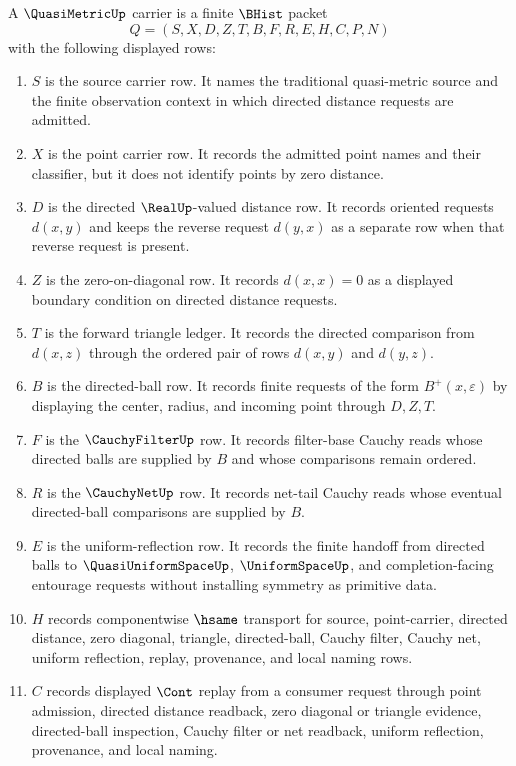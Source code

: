\begin{definition}
\label{def:quasi-metric-carrier}
A $\QuasiMetricUp$ carrier is a finite $\BHist$ packet
$$
Q=(S,X,D,Z,T,B,F,R,E,H,C,P,N)
$$
with the following displayed rows:
\begin{enumerate}
\item $S$ is the source carrier row. It names the traditional quasi-metric source and the finite observation context in which directed distance requests are admitted.
\item $X$ is the point carrier row. It records the admitted point names and their classifier, but it does not identify points by zero distance.
\item $D$ is the directed $\RealUp$-valued distance row. It records oriented requests $d(x,y)$ and keeps the reverse request $d(y,x)$ as a separate row when that reverse request is present.
\item $Z$ is the zero-on-diagonal row. It records $d(x,x)=0$ as a displayed boundary condition on directed distance requests.
\item $T$ is the forward triangle ledger. It records the directed comparison from $d(x,z)$ through the ordered pair of rows $d(x,y)$ and $d(y,z)$.
\item $B$ is the directed-ball row. It records finite requests of the form $B^+(x,\varepsilon)$ by displaying the center, radius, and incoming point through $D,Z,T$.
\item $F$ is the $\CauchyFilterUp$ row. It records filter-base Cauchy reads whose directed balls are supplied by $B$ and whose comparisons remain ordered.
\item $R$ is the $\CauchyNetUp$ row. It records net-tail Cauchy reads whose eventual directed-ball comparisons are supplied by $B$.
\item $E$ is the uniform-reflection row. It records the finite handoff from directed balls to $\QuasiUniformSpaceUp$, $\UniformSpaceUp$, and completion-facing entourage requests without installing symmetry as primitive data.
\item $H$ records componentwise $\hsame$ transport for source, point-carrier, directed distance, zero diagonal, triangle, directed-ball, Cauchy filter, Cauchy net, uniform reflection, replay, provenance, and local naming rows.
\item $C$ records displayed $\Cont$ replay from a consumer request through point admission, directed distance readback, zero diagonal or triangle evidence, directed-ball inspection, Cauchy filter or net readback, uniform reflection, provenance, and local naming.

\end{enumerate}
\end{definition}
